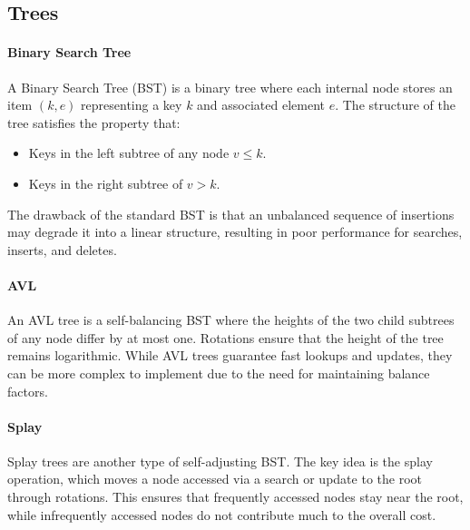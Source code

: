 \subsection{Trees}
\paragraph*{Binary Search Tree}
A Binary Search Tree (BST) is a binary tree where each internal node stores an item $(k, e)$ representing a key $k$ and associated element $e$. 
The structure of the tree satisfies the property that: 
\begin{itemize} 
    \item Keys in the left subtree of any node $v\leq k$. 
    \item Keys in the right subtree of $v>k$. 
\end{itemize}
The drawback of the standard BST is that an unbalanced sequence of insertions may degrade it into a linear structure, resulting in poor performance for searches, inserts, and deletes.

\paragraph*{AVL}
An AVL tree is a self-balancing BST where the heights of the two child subtrees of any node differ by at most one. 
Rotations ensure that the height of the tree remains logarithmic. 
While AVL trees guarantee fast lookups and updates, they can be more complex to implement due to the need for maintaining balance factors.

\paragraph*{Splay}
Splay trees are another type of self-adjusting BST.
The key idea is the splay operation, which moves a node accessed via a search or update to the root through rotations. 
This ensures that frequently accessed nodes stay near the root, while infrequently accessed nodes do not contribute much to the overall cost.

